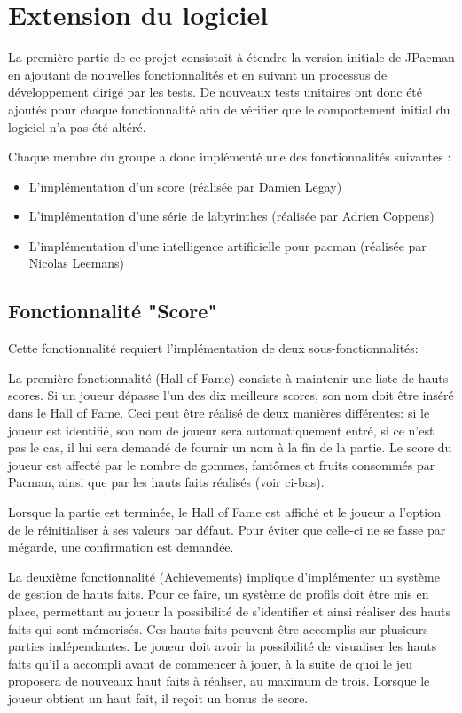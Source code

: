 \documentclass[12pt, openany]{report}
\begin{document}
\section{Extension du logiciel}\label{extensions}

La première partie de ce projet consistait à étendre la version initiale de JPacman en ajoutant de nouvelles fonctionnalités et en suivant un processus de développement dirigé par les tests. De nouveaux tests unitaires ont donc été ajoutés pour chaque fonctionnalité afin de vérifier que le comportement initial du logiciel n’a pas été altéré. 

Chaque membre du groupe a donc implémenté une des fonctionnalités suivantes :
\begin{itemize}
\item L'implémentation d'un score (réalisée par Damien Legay)
\item L'implémentation d'une série de labyrinthes (réalisée par Adrien Coppens)
\item L'implémentation d'une intelligence artificielle pour pacman (réalisée par Nicolas Leemans)
\end{itemize}


\subsection{Fonctionnalité "Score"}\label{score}
Cette fonctionnalité requiert l'implémentation de deux sous-fonctionnalités:

La première fonctionnalité (Hall of Fame) consiste à maintenir une liste de hauts scores. Si un joueur dépasse l'un des dix meilleurs scores, son nom doit être inséré dans le Hall of Fame.
Ceci peut être réalisé de deux manières différentes: si le joueur est identifié, son nom de joueur sera automatiquement entré, si ce n'est pas le cas, il lui sera demandé de fournir un nom à la fin de la partie.
Le score du joueur est affecté par le nombre de gommes, fantômes et fruits consommés par Pacman, ainsi que par les hauts faits réalisés (voir ci-bas).

Lorsque la partie est terminée, le Hall of Fame est affiché et le joueur a l'option de le réinitialiser à ses valeurs par défaut. Pour éviter que celle-ci ne se fasse par mégarde, une confirmation est demandée.

La deuxième fonctionnalité (Achievements) implique d'implémenter un système de gestion de hauts faits. 
Pour ce faire, un système de profils doit être mis en place, permettant au joueur la possibilité de s'identifier et ainsi réaliser des hauts faits qui sont mémorisés.
Ces hauts faits peuvent être accomplis sur plusieurs parties indépendantes.
Le joueur doit avoir la possibilité de visualiser les hauts faits qu'il a accompli avant de commencer à jouer, à la suite de quoi le jeu proposera de nouveaux haut faits à réaliser, au maximum de trois.
Lorsque le joueur obtient un haut fait, il reçoit un bonus de score.
\end{document}
